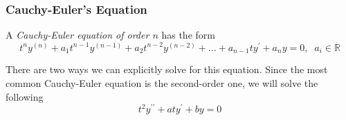 \documentclass{article}
\newcounter{definition}[section]
\begin{document}
    \subsubsection{Cauchy-Euler's Equation}

      \begin{definition}
        \label{def:cauchy-euler-equation-of-order-n}
      A \textit{Cauchy-Euler equation of order $n$} has the form 
      \begin{equation}
        t^n y^{(n)} + a_1 t^{n-1} y^{(n-1)} + a_2 t^{n-2} y^{(n-2)} + ... + a_{n-1} t y^\prime + a_n y = 0, \;\; a_i \in \mathbb{R}
      \end{equation}
      \end{definition}

      There are two ways we can explicitly solve for this equation. Since the most common Cauchy-Euler equation is the second-order one, we will solve the following 
      \begin{equation}
        t^2 y^{\prime \prime} + a t y^\prime + b y = 0
      \end{equation}
\end{document}

